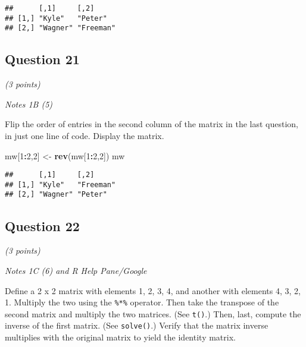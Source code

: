 \documentclass[
]{article}
\newenvironment{Shaded}{\begin{snugshade}}{\end{snugshade}}
\newcommand{\DataTypeTok}[1]{\textcolor[rgb]{0.13,0.29,0.53}{#1}}
\newcommand{\DecValTok}[1]{\textcolor[rgb]{0.00,0.00,0.81}{#1}}
\newcommand{\KeywordTok}[1]{\textcolor[rgb]{0.13,0.29,0.53}{\textbf{#1}}}
\newcommand{\NormalTok}[1]{#1}
\newcommand{\OperatorTok}[1]{\textcolor[rgb]{0.81,0.36,0.00}{\textbf{#1}}}
\newcommand{\StringTok}[1]{\textcolor[rgb]{0.31,0.60,0.02}{#1}}
\begin{document}
\begin{verbatim}
##      [,1]     [,2]     
## [1,] "Kyle"   "Peter"  
## [2,] "Wagner" "Freeman"
\end{verbatim}

\hypertarget{question-21}{%
\subsection{Question 21}\label{question-21}}

\emph{(3 points)}

\emph{Notes 1B (5)}

Flip the order of entries in the second column of the matrix in the last
question, in just one line of code. Display the matrix.

\begin{Shaded}
\begin{Highlighting}[]
\NormalTok{mw[}\DecValTok{1}\OperatorTok{:}\DecValTok{2}\NormalTok{,}\DecValTok{2}\NormalTok{] <-}\StringTok{ }\KeywordTok{rev}\NormalTok{(mw[}\DecValTok{1}\OperatorTok{:}\DecValTok{2}\NormalTok{,}\DecValTok{2}\NormalTok{])}
\NormalTok{mw}
\end{Highlighting}
\end{Shaded}

\begin{verbatim}
##      [,1]     [,2]     
## [1,] "Kyle"   "Freeman"
## [2,] "Wagner" "Peter"
\end{verbatim}

\hypertarget{question-22}{%
\subsection{Question 22}\label{question-22}}

\emph{(3 points)}

\emph{Notes 1C (6) and R Help Pane/Google}

Define a 2 x 2 matrix with elements 1, 2, 3, 4, and another with
elements 4, 3, 2, 1. Multiply the two using the \texttt{\%*\%} operator.
Then take the transpose of the second matrix and multiply the two
matrices. (See \texttt{t()}.) Then, last, compute the inverse of the
first matrix. (See \texttt{solve()}.) Verify that the matrix inverse
multiplies with the original matrix to yield the identity matrix.

\begin{Shaded}
\end{Shaded}
\end{document}
